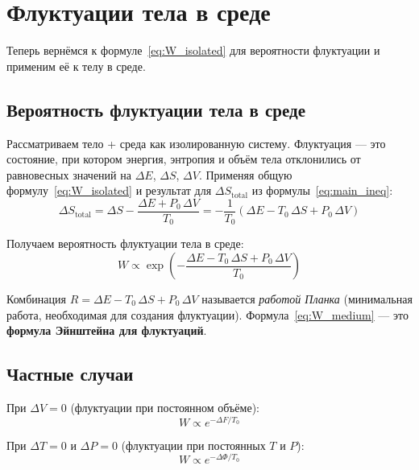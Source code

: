 \documentclass[../general/general]{subfiles}
\begin{document}


\section{Флуктуации тела в среде}

Теперь вернёмся к формуле~\eqref{eq:W_isolated} для вероятности флуктуации и применим её к телу в среде.

\subsection{Вероятность флуктуации тела в среде}

Рассматриваем тело + среда как изолированную систему. Флуктуация --- это состояние, при котором энергия, энтропия и объём тела отклонились от равновесных значений на $\Delta E$, $\Delta S$, $\Delta V$. Применяя общую формулу~\eqref{eq:W_isolated} и результат для $\Delta S_{\text{total}}$ из формулы~\eqref{eq:main_ineq}:
\begin{equation}
    \Delta S_{\text{total}} = \Delta S - \frac{\Delta E + P_0\,\Delta V}{T_0} = -\frac{1}{T_0}\left(\Delta E - T_0\,\Delta S + P_0\,\Delta V\right)
\end{equation}

Получаем вероятность флуктуации тела в среде:
\begin{equation}
    \boxed{W \propto \exp\!\left(-\frac{\Delta E - T_0\,\Delta S + P_0\,\Delta V}{T_0}\right)}
    \label{eq:W_medium}
\end{equation}

Комбинация $R = \Delta E - T_0\,\Delta S + P_0\,\Delta V$ называется \emph{работой Планка} (минимальная работа, необходимая для создания флуктуации). Формула~\eqref{eq:W_medium} --- это \textbf{формула Эйнштейна для флуктуаций}.

\subsection{Частные случаи}

При $\Delta V = 0$ (флуктуации при постоянном объёме):
\begin{equation}
    W \propto e^{-\Delta F/T_0}
\end{equation}

При $\Delta T = 0$ и $\Delta P = 0$ (флуктуации при постоянных $T$ и $P$):
\begin{equation}
    W \propto e^{-\Delta\Phi/T_0}
\end{equation}
\end{document}
